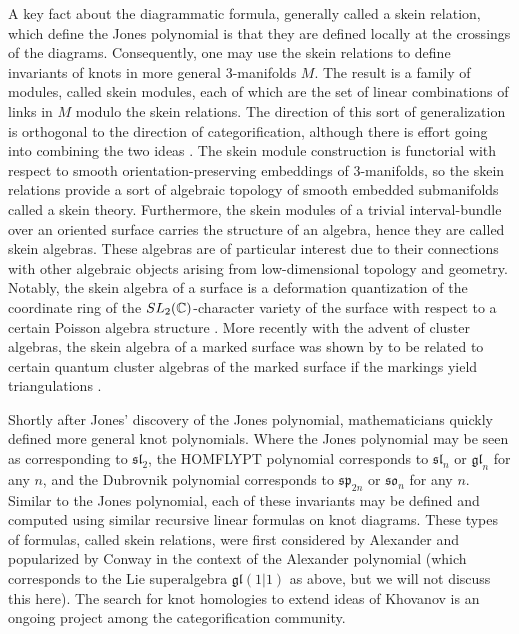 A key fact about the diagrammatic formula, generally called a skein relation, which define the Jones polynomial is that they are defined locally at the crossings of the diagrams. Consequently, one may use the skein relations to define invariants of knots in more general $3$-manifolds $M$. The result is a family of modules, called skein modules, each of which are the set of linear combinations of links in $M$ modulo the skein relations. The direction of this sort of generalization is orthogonal to the direction of categorification, although there is effort going into combining the two ideas \cite{APS04}. The skein module construction is functorial with respect to smooth orientation-preserving embeddings of $3$-manifolds, so the skein relations provide a sort of algebraic topology of smooth embedded submanifolds called a skein theory. Furthermore, the skein modules of a trivial interval-bundle over an oriented surface carries the structure of an algebra, hence they are called skein algebras. These algebras are of particular interest due to their connections with other algebraic objects arising from low-dimensional topology and geometry. Notably, the skein algebra of a surface is a deformation quantization of the coordinate ring of the $SL_2(\mathbb{C})$-character variety of the surface with respect to a certain Poisson algebra structure \cite{BFK99}. More recently with the advent of cluster algebras, the skein algebra of a marked surface was shown by to be related to certain quantum cluster algebras of the marked surface if the markings yield triangulations \cite{Mul16}.

Shortly after Jones' discovery of the Jones polynomial, mathematicians quickly defined more general knot polynomials. Where the Jones polynomial may be seen as corresponding to $\mathfrak{sl}_2$, the HOMFLYPT polynomial \cite{FHLMOY85} \cite{PT88} corresponds to $\mathfrak{sl}_n$ or $\mathfrak{gl}_n$ for any $n$, and the Dubrovnik polynomial \cite{Kau90} corresponds to $\mathfrak{sp}_{2n}$ or $\mathfrak{so}_n$ for any $n$. Similar to the Jones polynomial, each of these invariants may be defined and computed using similar recursive linear formulas on knot diagrams. These types of formulas, called skein relations, were first considered by Alexander \cite{Ale28} and popularized by Conway \cite{Con70} in the context of the Alexander polynomial (which corresponds to the Lie superalgebra $\mathfrak{gl}(1|1)$ as above, but we will not discuss this here). The search for knot homologies to extend ideas of Khovanov is an ongoing project among the categorification community. 

